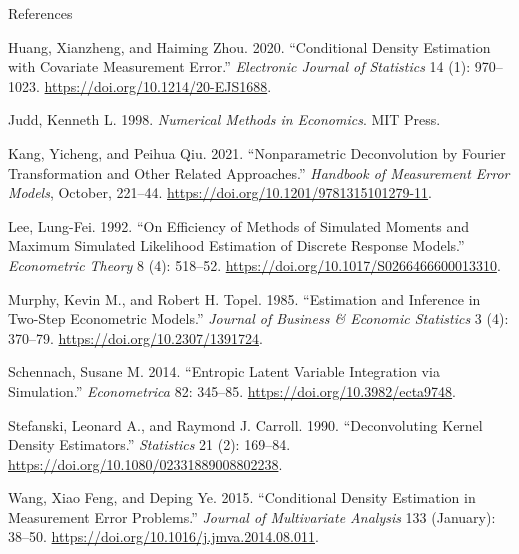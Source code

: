 \documentclass[
  ignorenonframetext,
  aspectratio=169,
]{beamer}
\newlength{\cslhangindent}
\newenvironment{CSLReferences}[2] %
 {\begin{list}{}{%
  \setlength{\itemindent}{0pt}
  \setlength{\leftmargin}{0pt}
  \setlength{\parsep}{0pt}
  \ifodd #1
   \setlength{\leftmargin}{\cslhangindent}
   \setlength{\itemindent}{-1\cslhangindent}
  \fi
  \setlength{\itemsep}{#2\baselineskip}}}
 {\end{list}}
\begin{document}
\begin{frame}{References}
\begin{CSLReferences}{1}{1}
Huang, Xianzheng, and Haiming Zhou. 2020. {``Conditional Density
Estimation with Covariate Measurement Error.''} \emph{Electronic Journal
of Statistics} 14 (1): 970--1023.
\url{https://doi.org/10.1214/20-EJS1688}.

Judd, Kenneth L. 1998. \emph{Numerical Methods in Economics}. MIT Press.

Kang, Yicheng, and Peihua Qiu. 2021. {``Nonparametric Deconvolution by
Fourier Transformation and Other Related Approaches.''} \emph{Handbook
of Measurement Error Models}, October, 221--44.
\url{https://doi.org/10.1201/9781315101279-11}.

Lee, Lung-Fei. 1992. {``On Efficiency of Methods of Simulated Moments
and Maximum Simulated Likelihood Estimation of Discrete Response
Models.''} \emph{Econometric Theory} 8 (4): 518--52.
\url{https://doi.org/10.1017/S0266466600013310}.

Murphy, Kevin M., and Robert H. Topel. 1985. {``Estimation and Inference
in Two-Step Econometric Models.''} \emph{Journal of Business \& Economic
Statistics} 3 (4): 370--79. \url{https://doi.org/10.2307/1391724}.

Schennach, Susane M. 2014. {``Entropic Latent Variable Integration via
Simulation.''} \emph{Econometrica} 82: 345--85.
\url{https://doi.org/10.3982/ecta9748}.

Stefanski, Leonard A., and Raymond J. Carroll. 1990. {``Deconvoluting
Kernel Density Estimators.''} \emph{Statistics} 21 (2): 169--84.
\url{https://doi.org/10.1080/02331889008802238}.

Wang, Xiao Feng, and Deping Ye. 2015. {``Conditional Density Estimation
in Measurement Error Problems.''} \emph{Journal of Multivariate
Analysis} 133 (January): 38--50.
\url{https://doi.org/10.1016/j.jmva.2014.08.011}.

\end{CSLReferences}
\end{frame}
\end{document}
